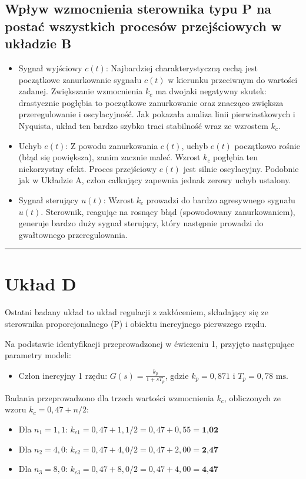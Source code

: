 \documentclass[12pt,a4paper]{article}
\begin{document}
	\subsection{Wpływ wzmocnienia sterownika typu P na postać wszystkich procesów przejściowych w układzie B}
	\begin{itemize}
		\item Sygnał wyjściowy $c(t)$: Najbardziej charakterystyczną cechą jest początkowe zanurkowanie sygnału $c(t)$ w kierunku przeciwnym do wartości zadanej. Zwiększanie wzmocnienia $k_c$ ma dwojaki negatywny skutek: drastycznie pogłębia to początkowe zanurkowanie oraz znacząco zwiększa przeregulowanie i oscylacyjność. Jak pokazała analiza linii pierwiastkowych i Nyquista, układ ten bardzo szybko traci stabilność wraz ze wzrostem $k_c$.
		\item Uchyb $e(t)$: Z powodu zanurkowania $c(t)$, uchyb $e(t)$ początkowo rośnie (błąd się powiększa), zanim zacznie maleć. Wzrost $k_c$ pogłębia ten niekorzystny efekt. Proces przejściowy $e(t)$ jest silnie oscylacyjny. Podobnie jak w Układzie A, człon całkujący zapewnia jednak zerowy uchyb ustalony.
		\item Sygnał sterujący $u(t)$: Wzrost $k_c$ prowadzi do bardzo agresywnego sygnału $u(t)$. Sterownik, reagując na rosnący błąd (spowodowany zanurkowaniem), generuje bardzo duży sygnał sterujący, który następnie prowadzi do gwałtownego przeregulowania.
	\end{itemize}
	
	\bigskip \hrule \bigskip
	
	\section{Układ D}
	
	Ostatni badany układ to układ regulacji z zakłóceniem, składający się ze sterownika proporcjonalnego (P) i obiektu inercyjnego pierwszego rzędu.
	
	Na podstawie identyfikacji przeprowadzonej w ćwiczeniu 1, przyjęto następujące parametry modeli:
	\begin{itemize}
		\item Człon inercyjny 1 rzędu: $G(s) = \frac{k_p}{1+sT_p}$, gdzie $k_p = 0,871$ i $T_p = 0,78 \text{ ms}$.
	\end{itemize}
	
	Badania przeprowadzono dla trzech wartości wzmocnienia \(k_c\), obliczonych ze wzoru \(k_c = 0,47 + n/2\):
	\begin{itemize}
		\item Dla \(n_1 = 1,1\): $k_{c1} = 0,47 + 1,1 / 2 = 0,47 + 0,55 = \textbf{1,02}$
		\item Dla \(n_2 = 4,0\): $k_{c2} = 0,47 + 4,0 / 2 = 0,47 + 2,00 = \textbf{2,47}$
		\item Dla \(n_3 = 8,0\): $k_{c3} = 0,47 + 8,0 / 2 = 0,47 + 4,00 = \textbf{4,47}$
	\end{itemize}
	
\end{document}
